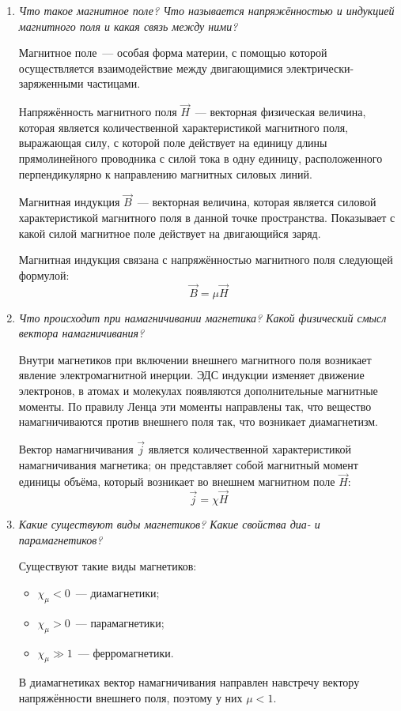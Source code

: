 \documentclass[paper=a4,10pt,pagesize]{scrartcl}
\begin{document}
\begin{enumerate}
  \item \textit{Что такое магнитное поле? Что называется напряжённостью и индукцией магнитного поля и какая связь между ними?}

Магнитное поле~--- особая форма материи, с помощью которой осуществляется взаимодействие между двигающимися электрически-заряженными частицами.

Напряжённость магнитного поля $\vec{H}$~--- векторная физическая величина, которая является количественной характеристикой магнитного поля, выражающая силу, с которой поле действует на единицу длины прямолинейного проводника с силой тока в одну единицу, расположенного перпендикулярно к направлению магнитных силовых линий.

Магнитная индукция $\vec{B}$~--- векторная величина, которая является силовой характеристикой магнитного поля в данной точке пространства. Показывает с какой силой магнитное поле действует на двигающийся заряд.

Магнитная индукция связана с напряжённостью магнитного поля следующей формулой:
$$\vec{B}=\mu\vec{H}$$
\item \textit{\small Что происходит при намагничивании магнетика? Какой физический смысл вектора намагничивания?}

Внутри магнетиков при включении внешнего магнитного поля возникает явление электромагнитной инерции.
ЭДС индукции изменяет движение электронов, в атомах и молекулах появляются дополнительные магнитные моменты.
По правилу Ленца эти моменты направлены так, что вещество намагничиваются против внешнего поля так, что возникает диамагнетизм.

Вектор намагничивания $\vec{j}$ является количественной характеристикой намагничивания магнетика; он представляет собой магнитный момент единицы объёма, который возникает во внешнем магнитном поле $\vec{H}$:
$$\vec{j}=\chi\vec{H}$$
\item \textit{Какие существуют виды магнетиков? Какие свойства диа- и парамагнетиков?}

Существуют такие виды магнетиков:
\begin{itemize}
    \item $\chi_\mu<0$~--- диамагнетики;
    \item $\chi_\mu>0$~--- парамагнетики;
    \item $\chi_\mu\gg1$~--- ферромагнетики.
\end{itemize}
В диамагнетиках вектор намагничивания направлен навстречу вектору напряжённости внешнего поля, поэтому у них $\mu<1$.


\end{enumerate}
\end{document}

